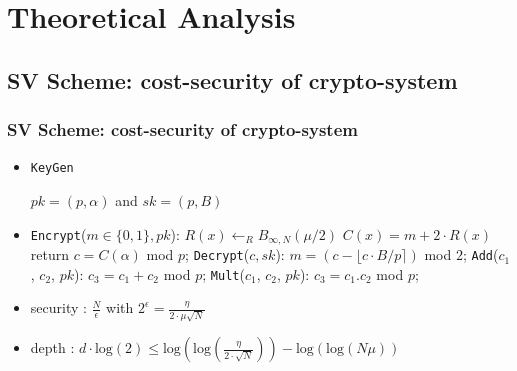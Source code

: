 \documentclass{beamer}
\begin{document}
\section{Theoretical Analysis}

\subsection{SV Scheme: cost-security of crypto-system}

\begin{frame} \frametitle{SV Scheme: cost-security of crypto-system}
  \begin{itemize}
  \item \texttt{KeyGen}

    $pk = (p, \alpha)$ and $sk = (p , B)$
    \pause
  \item  \texttt{Encrypt}($m \in \{0,1\} , pk$): 
    \newline   $R(x) \leftarrow_{R}B_{\infty , N}(\mu/2)$
    \; $C(x)=m+2\cdot R(x)$ 
    \newline \phantom{x}\hspace{3ex} return  $c=C(\alpha)$ mod $p$;
    \newline \texttt{Decrypt}($c, sk$):
    \newline \phantom{x}\hspace{3ex} $m = (c - \lfloor c \cdot B/p \rceil )$ mod $2$;
    \newline \texttt{Add}($c_1$, $c_2$, $pk$):
    \newline \phantom{x}\hspace{3ex} $c_3=c_1+c_2$ mod $p$; 
    \newline \texttt{Mult}($c_1$, $c_2$, $pk$):
    \newline \phantom{x}\hspace{3ex}  $c_3=c_1.c_2$ mod $p$; 
    \pause

  \item security : $\frac{N}{\epsilon}$ with $2 ^ \epsilon = \frac{\eta}{2\cdot \mu \sqrt{N}} $
  \item depth :  $d \cdot \mathrm{log}(2) \leq  \mathrm{log}\left( \mathrm{log}\left(\frac{\eta}{2\cdot \sqrt{N}}\right) \right) - \mathrm{log}\left(\mathrm{log}\left( N\mu\right)\right)$
  \end{itemize}
\end{frame}
\end{document}
